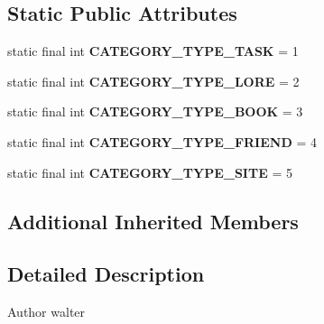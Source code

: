 \subsection*{Static Public Attributes}
\begin{DoxyCompactItemize}
\item 
\hypertarget{classcom_1_1github_1_1walterfan_1_1gtd_1_1model_1_1Category_ae30e233a23980f0299d7ffa8e562226b}{static final int {\bfseries C\-A\-T\-E\-G\-O\-R\-Y\-\_\-\-T\-Y\-P\-E\-\_\-\-T\-A\-S\-K} = 1}\label{classcom_1_1github_1_1walterfan_1_1gtd_1_1model_1_1Category_ae30e233a23980f0299d7ffa8e562226b}

\item 
\hypertarget{classcom_1_1github_1_1walterfan_1_1gtd_1_1model_1_1Category_a38a36ad79577bc1fd1d025fa09e5ff1c}{static final int {\bfseries C\-A\-T\-E\-G\-O\-R\-Y\-\_\-\-T\-Y\-P\-E\-\_\-\-L\-O\-R\-E} = 2}\label{classcom_1_1github_1_1walterfan_1_1gtd_1_1model_1_1Category_a38a36ad79577bc1fd1d025fa09e5ff1c}

\item 
\hypertarget{classcom_1_1github_1_1walterfan_1_1gtd_1_1model_1_1Category_a55c331913d0440d8b7c8fad74905b442}{static final int {\bfseries C\-A\-T\-E\-G\-O\-R\-Y\-\_\-\-T\-Y\-P\-E\-\_\-\-B\-O\-O\-K} = 3}\label{classcom_1_1github_1_1walterfan_1_1gtd_1_1model_1_1Category_a55c331913d0440d8b7c8fad74905b442}

\item 
\hypertarget{classcom_1_1github_1_1walterfan_1_1gtd_1_1model_1_1Category_aa766b7c2c2eed4870aa641a992b21afa}{static final int {\bfseries C\-A\-T\-E\-G\-O\-R\-Y\-\_\-\-T\-Y\-P\-E\-\_\-\-F\-R\-I\-E\-N\-D} = 4}\label{classcom_1_1github_1_1walterfan_1_1gtd_1_1model_1_1Category_aa766b7c2c2eed4870aa641a992b21afa}

\item 
\hypertarget{classcom_1_1github_1_1walterfan_1_1gtd_1_1model_1_1Category_abdd346424f44d02487dee9f7725b5da9}{static final int {\bfseries C\-A\-T\-E\-G\-O\-R\-Y\-\_\-\-T\-Y\-P\-E\-\_\-\-S\-I\-T\-E} = 5}\label{classcom_1_1github_1_1walterfan_1_1gtd_1_1model_1_1Category_abdd346424f44d02487dee9f7725b5da9}

\end{DoxyCompactItemize}
\subsection*{Additional Inherited Members}


\subsection{Detailed Description}
\begin{DoxyAuthor}{Author}
walter 
\end{DoxyAuthor}


